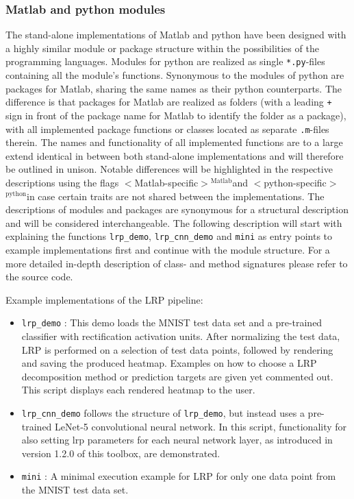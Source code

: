 \documentclass[a4wide]{article}
\newcommand{\mat}{$^\text{Matlab}$}
\newcommand{\py}{$^\text{python}$}
\begin{document}
\subsubsection*{Matlab and python modules}
The stand-alone implementations of Matlab and python have been designed with a highly similar module or package structure within the possibilities of the programming languages. Modules for python are realized as single \texttt{*.py}-files containing all the module's functions. Synonymous to the modules of python are packages for Matlab, sharing the same names as their python counterparts. The difference is that packages for Matlab are realized as folders (with a leading \texttt{+} sign in front of the package name for Matlab to identify the folder as a package), with all implemented package functions or classes located as separate \texttt{.m}-files therein. The names and functionality of all implemented functions are to a large extend identical in between both stand-alone implementations and will therefore be outlined in unison. Notable differences will be highlighted in the respective descriptions using the flags $<$Matlab-specific$>$\mat and $<$python-specific$>$\py in case certain traits are not shared between the implementations. The descriptions of modules and packages are synonymous for a structural description and will be considered interchangeable. The following description will start with explaining the functions \texttt{lrp\_demo}, \texttt{lrp\_cnn\_demo} and \texttt{mini} as entry points to example implementations first and continue with the module structure. For a more detailed in-depth description of class- and method signatures please refer to the source code. 

Example implementations of the LRP pipeline:
\begin{itemize}
\item \texttt{lrp\_demo} : This demo loads the MNIST test data set and a pre-trained classifier with rectification activation units. After normalizing the test data, LRP is performed on a selection of test data points, followed by rendering and saving the produced heatmap. Examples on how to choose a LRP decomposition method or prediction targets are given yet commented out. This script displays each rendered heatmap to the user.

\item \texttt{lrp\_cnn\_demo} follows the structure of \texttt{lrp\_demo}, but instead uses a pre-trained LeNet-5 convolutional neural network. In this script, functionality for also setting lrp parameters for each neural network layer, as introduced in version 1.2.0 of this toolbox, are demonstrated.

\item \texttt{mini} : A minimal execution example for LRP for only one data point from the MNIST test data set.
\end{itemize}
\end{document}

